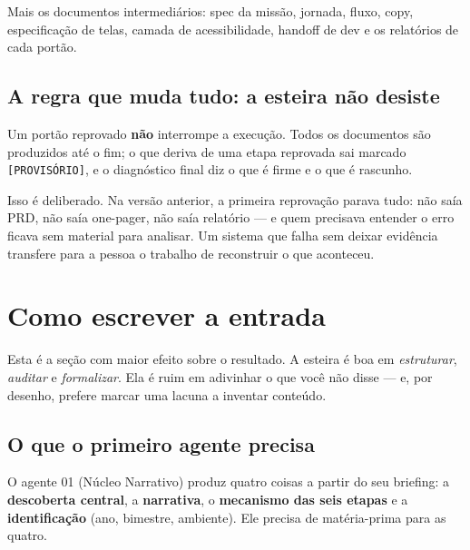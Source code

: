 \documentclass[11pt,a4paper]{article}
\newcommand{\cod}[1]{\texttt{\small #1}}
\begin{document}
\noindent
Mais os documentos intermediários: spec da missão, jornada, fluxo, copy, especificação de
telas, camada de acessibilidade, handoff de dev e os relatórios de cada portão.

\subsection{A regra que muda tudo: a esteira não desiste}

Um portão reprovado \textbf{não} interrompe a execução. Todos os documentos são produzidos
até o fim; o que deriva de uma etapa reprovada sai marcado \cod{[PROVISÓRIO]}, e o
diagnóstico final diz o que é firme e o que é rascunho.

Isso é deliberado. Na versão anterior, a primeira reprovação parava tudo: não saía PRD, não
saía one-pager, não saía relatório --- e quem precisava entender o erro ficava sem material
para analisar. Um sistema que falha sem deixar evidência transfere para a pessoa o trabalho
de reconstruir o que aconteceu.

\section{Como escrever a entrada}
\label{sec:entrada}

Esta é a seção com maior efeito sobre o resultado. A esteira é boa em \emph{estruturar},
\emph{auditar} e \emph{formalizar}. Ela é ruim em adivinhar o que você não disse --- e, por
desenho, prefere marcar uma lacuna a inventar conteúdo.

\subsection{O que o primeiro agente precisa}

O agente 01 (Núcleo Narrativo) produz quatro coisas a partir do seu briefing: a
\textbf{descoberta central}, a \textbf{narrativa}, o \textbf{mecanismo das seis etapas} e a
\textbf{identificação} (ano, bimestre, ambiente). Ele precisa de matéria-prima para as
quatro.
\end{document}

